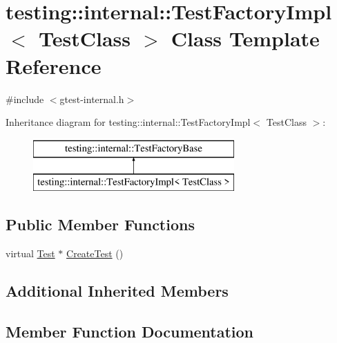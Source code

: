 \hypertarget{classtesting_1_1internal_1_1_test_factory_impl}{}\section{testing\+::internal\+::Test\+Factory\+Impl$<$ Test\+Class $>$ Class Template Reference}
\label{classtesting_1_1internal_1_1_test_factory_impl}


{\ttfamily \#include $<$gtest-\/internal.\+h$>$}

Inheritance diagram for testing\+::internal\+::Test\+Factory\+Impl$<$ Test\+Class $>$\+:\begin{figure}[H]
\begin{center}
\leavevmode
\includegraphics[height=2.000000cm]{classtesting_1_1internal_1_1_test_factory_impl}
\end{center}
\end{figure}
\subsection*{Public Member Functions}
\begin{DoxyCompactItemize}
\item 
virtual \mbox{\hyperlink{classtesting_1_1_test}{Test}} $\ast$ \mbox{\hyperlink{classtesting_1_1internal_1_1_test_factory_impl_a8860c89bdb06450a5d5e8137ebd9d775}{Create\+Test}} ()
\end{DoxyCompactItemize}
\subsection*{Additional Inherited Members}


\subsection{Member Function Documentation}
\mbox{\label{classtesting_1_1internal_1_1_test_factory_impl_a8860c89bdb06450a5d5e8137ebd9d775}} 
